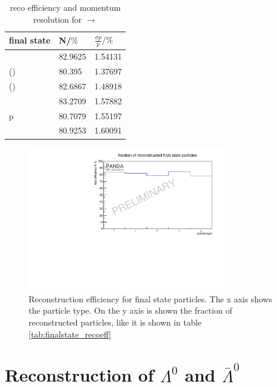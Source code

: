 	\begin{table}
		\centering
		\caption{\propose reco efficiency and momentum resolution for \pbarpSystem $\rightarrow$ \excitedanticascade \cascade}
		\label{tab:finalstate_recoeff_cc}
		\begin{tabular}{lll}
			\hline
			final state & N/$\%$ & $\frac{\sigma p}{p}/\%$ \\
			\hline
			\hline
			\piplus &  82.9625&   1.54131\\
			\piminusone(\cascade) & 80.395&   1.37697  \\
			\piminustwo(\lam) &  82.6867&   1.48918\\
			\kplus& 83.2709&   1.57882 \\
			p &  80.7079&   1.55197\\
			\antiproton &  80.9253&   1.60091\\\hline
			 
		\end{tabular}
	\end{table}
	
	\begin{figure}
	
		\centering
		\includegraphics[width=0.8\textwidth]{./plots/finalstate/reco_efficiency.pdf}
		\caption{\propose Reconstruction efficiency for final state particles. The x axis shows the particle type. 
				On the y axis is shown the fraction of reconstructed particles, like it is shown in table \ref{tab:finalstate_recoeff}}
		\label{fig:finalstate_recoeff}
	
	\end{figure}
	

	
\section{Reconstruction of $\Lambda^0$ and $\bar{\Lambda}^0$}
